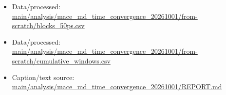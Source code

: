 \begin{itemize}[leftmargin=1.4em,noitemsep]
\item Data/processed: \begingroup\scriptsize\url{main/analysis/mace_md_time_convergence_20261001/from-scratch/blocks_50ps.csv}\endgroup
\item Data/processed: \begingroup\scriptsize\url{main/analysis/mace_md_time_convergence_20261001/from-scratch/cumulative_windows.csv}\endgroup
\item Caption/text source: \begingroup\scriptsize\url{main/analysis/mace_md_time_convergence_20261001/REPORT.md}\endgroup
\end{itemize}
